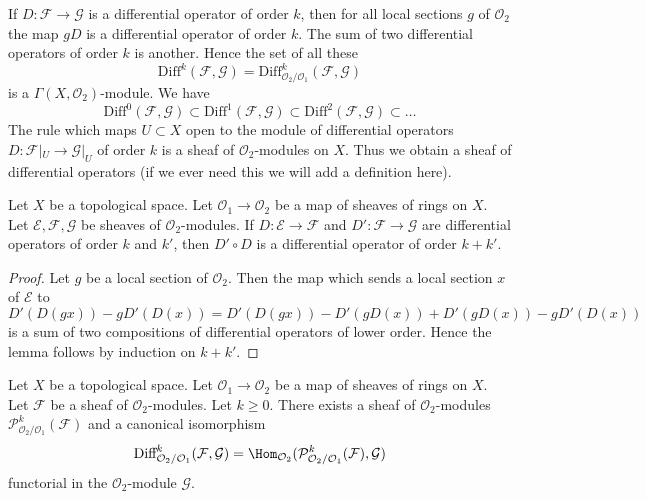 \noindent
If $D : \mathcal{F} \to \mathcal{G}$ is a differential operator of order $k$,
then for all local sections $g$ of $\mathcal{O}_2$ the map $gD$ is a
differential operator of order $k$. The sum of two differential operators of
order $k$ is another. Hence the set of all these
$$
\text{Diff}^k(\mathcal{F}, \mathcal{G}) =
\text{Diff}^k_{\mathcal{O}_2/\mathcal{O}_1}(\mathcal{F}, \mathcal{G})
$$
is a $\Gamma(X, \mathcal{O}_2)$-module. We have
$$
\text{Diff}^0(\mathcal{F}, \mathcal{G}) \subset
\text{Diff}^1(\mathcal{F}, \mathcal{G}) \subset
\text{Diff}^2(\mathcal{F}, \mathcal{G}) \subset \ldots
$$
The rule which maps $U \subset X$ open to the module of
differential operators $D : \mathcal{F}|_U \to \mathcal{G}|_U$
of order $k$ is a sheaf of $\mathcal{O}_2$-modules on $X$.
Thus we obtain a sheaf of differential operators (if we ever need this we will
add a definition here).

\begin{lemma}
\label{lemma-composition-differential-operators}
Let $X$ be a topological space.
Let $\mathcal{O}_1 \to \mathcal{O}_2$ be a map of sheaves of rings on $X$.
Let $\mathcal{E}, \mathcal{F}, \mathcal{G}$ be sheaves of
$\mathcal{O}_2$-modules.
If $D : \mathcal{E} \to \mathcal{F}$ and $D' : \mathcal{F} \to \mathcal{G}$
are differential operators of order $k$ and $k'$, then $D' \circ D$ is a
differential operator of order $k + k'$.
\end{lemma}

\begin{proof}
Let $g$ be a local section of $\mathcal{O}_2$.
Then the map which sends a local section $x$ of $\mathcal{E}$ to
$$
D'(D(gx)) - gD'(D(x)) = D'(D(gx)) - D'(gD(x)) + D'(gD(x)) - gD'(D(x))
$$
is a sum of two compositions of differential operators of lower order.
Hence the lemma follows by induction on $k + k'$.
\end{proof}

\begin{lemma}
\label{lemma-module-principal-parts}
Let $X$ be a topological space.
Let $\mathcal{O}_1 \to \mathcal{O}_2$ be a map of sheaves of rings on $X$.
Let $\mathcal{F}$ be a sheaf of $\mathcal{O}_2$-modules.
Let $k \geq 0$. There exists a sheaf of $\mathcal{O}_2$-modules
$\mathcal{P}^k_{\mathcal{O}_2/\mathcal{O}_1}(\mathcal{F})$
and a canonical isomorphism
$$
\text{Diff}^k_{\mathcal{O}_2/\mathcal{O}_1}(\mathcal{F}, \mathcal{G}) =
\Hom_{\mathcal{O}_2}(
\mathcal{P}^k_{\mathcal{O}_2/\mathcal{O}_1}(\mathcal{F}), \mathcal{G})
$$
functorial in the $\mathcal{O}_2$-module $\mathcal{G}$.
\end{lemma}

